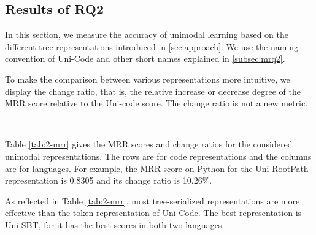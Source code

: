 \documentclass[conference]{IEEEtran}
\begin{document}
\subsection{Results of RQ2}

In this section, we measure the accuracy of unimodal learning based on the different tree representations introduced in \autoref{sec:approach}. We use the naming convention of Uni-Code and other short names explained in \autoref{subsec:mrq2}. 

To make the comparison between various representations more intuitive, we display the change ratio, that is, the relative increase or decrease degree of the MRR score relative to the Uni-code score. The change ratio is not a new metric.

\begin{table}[thb]
\centering
\caption{RQ2: MRR Scores of Unimodal Representations. Uni-LCRS can be considered the best representation.}
~\\
\label{tab:2-mrr}
\end{table}
 

Table \ref{tab:2-mrr} gives the MRR scores and change ratios for the considered unimodal representations. The rows are for code representations and the columns are for languages. For example, the MRR score on Python for the Uni-RootPath representation is 0.8305 and its change ratio is 10.26\%.

As reflected in Table \ref{tab:2-mrr}, most tree-serialized representations are more effective than the token representation of Uni-Code. The best representation is Uni-SBT, for it has the best scores in both two languages.
\end{document}
